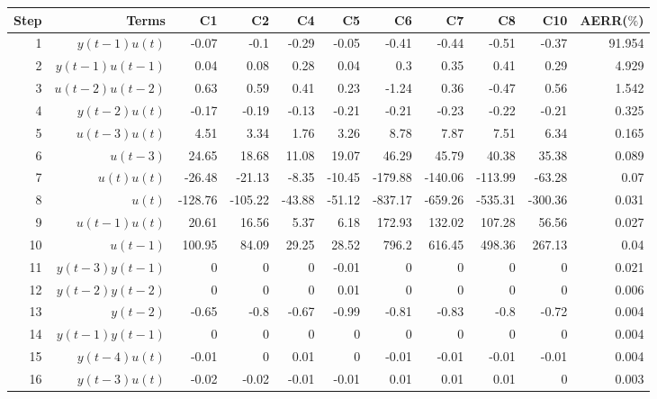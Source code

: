 \begin{tabular}{rrrrrrrrrrr}
Step & Terms & C1 & C2 & C4 & C5 & C6 & C7 & C8 & C10 & AERR($\%$) \\ 
\hline 
1 & $y(t-1)u(t)$ & -0.07 & -0.1 & -0.29 & -0.05 & -0.41 & -0.44 & -0.51 & -0.37 & 91.954 \\ 
2 & $y(t-1)u(t-1)$ & 0.04 & 0.08 & 0.28 & 0.04 & 0.3 & 0.35 & 0.41 & 0.29 & 4.929 \\ 
3 & $u(t-2)u(t-2)$ & 0.63 & 0.59 & 0.41 & 0.23 & -1.24 & 0.36 & -0.47 & 0.56 & 1.542 \\ 
4 & $y(t-2)u(t)$ & -0.17 & -0.19 & -0.13 & -0.21 & -0.21 & -0.23 & -0.22 & -0.21 & 0.325 \\ 
5 & $u(t-3)u(t)$ & 4.51 & 3.34 & 1.76 & 3.26 & 8.78 & 7.87 & 7.51 & 6.34 & 0.165 \\ 
6 & $u(t-3)$ & 24.65 & 18.68 & 11.08 & 19.07 & 46.29 & 45.79 & 40.38 & 35.38 & 0.089 \\ 
7 & $u(t)u(t)$ & -26.48 & -21.13 & -8.35 & -10.45 & -179.88 & -140.06 & -113.99 & -63.28 & 0.07 \\ 
8 & $u(t)$ & -128.76 & -105.22 & -43.88 & -51.12 & -837.17 & -659.26 & -535.31 & -300.36 & 0.031 \\ 
9 & $u(t-1)u(t)$ & 20.61 & 16.56 & 5.37 & 6.18 & 172.93 & 132.02 & 107.28 & 56.56 & 0.027 \\ 
10 & $u(t-1)$ & 100.95 & 84.09 & 29.25 & 28.52 & 796.2 & 616.45 & 498.36 & 267.13 & 0.04 \\ 
11 & $y(t-3)y(t-1)$ & 0 & 0 & 0 & -0.01 & 0 & 0 & 0 & 0 & 0.021 \\ 
12 & $y(t-2)y(t-2)$ & 0 & 0 & 0 & 0.01 & 0 & 0 & 0 & 0 & 0.006 \\ 
13 & $y(t-2)$ & -0.65 & -0.8 & -0.67 & -0.99 & -0.81 & -0.83 & -0.8 & -0.72 & 0.004 \\ 
14 & $y(t-1)y(t-1)$ & 0 & 0 & 0 & 0 & 0 & 0 & 0 & 0 & 0.004 \\ 
15 & $y(t-4)u(t)$ & -0.01 & 0 & 0.01 & 0 & -0.01 & -0.01 & -0.01 & -0.01 & 0.004 \\ 
16 & $y(t-3)u(t)$ & -0.02 & -0.02 & -0.01 & -0.01 & 0.01 & 0.01 & 0.01 & 0 & 0.003 \\ 
\hline 
\end{tabular}